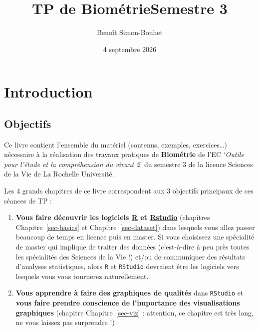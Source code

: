 \documentclass[
  a4paper,
  DIV=11,
  numbers=noendperiod,
  oneside]{scrreprt}
\title{TP de BiométrieSemestre 3}
\author{Benoît Simon-Bouhet}
\date{4 septembre 2026}
\renewcommand*\contentsname{Table des matières}
\newcommand\contentsname{Table des matières}
\begin{document}
\maketitle

\renewcommand*\contentsname{Table des matières}
{
\hypersetup{linkcolor=}
\setcounter{tocdepth}{2}
\tableofcontents
}


\chapter*{Introduction}\label{introduction}


\section*{Objectifs}\label{objectifs}


Ce livre contient l'ensemble du matériel (contenus, exemples,
exercices\ldots) nécessaire à la réalisation des travaux pratiques de
\textbf{Biométrie} de l'EC `\emph{Outils pour l'étude et la
compréhension du vivant 2}' du semestre 3 de la licence Sciences de la
Vie de La Rochelle Université.

Les 4 grands chapitres de ce livre correspondent aux 3 objectifs
principaux de ces séances de TP :

\begin{enumerate}
\def\labelenumi{\arabic{enumi}.}
\item
  \textbf{Vous faire découvrir les logiciels
  \href{https://cran.r-project.org}{R} et
  \href{https://www.rstudio.com}{Rstudio}} (chapitres
  Chapitre~\ref{sec-basics} et Chapitre~\ref{sec-dataset}) dans lesquels
  vous allez passer beaucoup de temps en licence puis en master. Si vous
  choisissez une spécialité de master qui implique de traiter des
  données (c'est-à-dire à peu près toutes les spécialités des Sciences
  de la Vie !) et/ou de communiquer des résultats d'analyses
  statistiques, alors \texttt{R} et \texttt{RStudio} devraient être les
  logiciels vers lesquels vous vous tournerez naturellement.
\item
  \textbf{Vous apprendre à faire des graphiques de qualités} dans
  \texttt{RStudio} et \textbf{vous faire prendre conscience de
  l'importance des visualisations graphiques} (chapitre
  Chapitre~\ref{sec-viz} : attention, ce chapitre est très long, ne vous
  laissez pas surprendre !) :
\end{enumerate}
\end{document}
